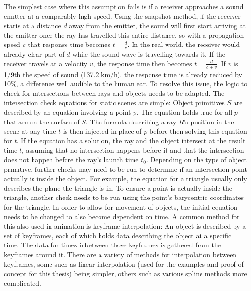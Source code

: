 The simplest case where this assumption fails is if a receiver approaches a sound emitter at a comparably high speed.
Using the snapshot method, if the receiver starts at a distance \(d\) away from the emitter,
the sound will first start arriving at the emitter once the ray has travelled this entire distance,
so with a propagation speed \(c\) that response time becomes \(t = \frac{d}{c}\).
In the real world, the receiver would already clear part of \(d\) while the sound wave is travelling towards it.
If the receiver travels at a velocity \(v\), the response time then becomes \(t = \frac{d}{c + v}\).
If \(v\) is 1/9th the speed of sound (137.2 km/h),
the response time is already reduced by 10\%, a difference well audible to the human ear.
\newline
To resolve this issue, the logic to check for intersections between rays and objects needs to be adapted.
The intersection check equations for static scenes are simple:
Object primitives \(S\) are described by an equation involving a point \(p\).
The equation holds true for all \(p\) that are on the surface of \(S\).
The formula describing a ray \(R\)'s position in the scene at any time \(t\) is then injected in place of \(p\)
before then solving this equation for \(t\).
If the equation has a solution, the ray and the object intersect at the result time \(t\),
assuming that no intersection happens before it and that the intersection does not happen before the ray's launch time \(t_0\).
\newline
Depending on the type of object primitive,
further checks may need to be run to determine if an intersection point actually is inside the object.
For example, the equation for a triangle usually only describes the plane the triangle is in.
To ensure a point is actually inside the triangle,
another check needs to be run using the point's barycentric coordinates for the triangle.
\newline
In order to allow for movement of objects,
the initial equation needs to be changed to also become dependent on time.
A common method for this also used in animation is keyframe interpolation:
An object is described by a set of keyframes, each of which holds data describing the object at a specific time.
The data for times inbetween those keyframes is gathered from the keyframes around it.
There are a variety of methods for interpolation between keyframes,
some such as linear interpolation (used for the examples and proof-of-concept for this thesis) being simpler,
others such as various spline methods more complicated.
\newline
